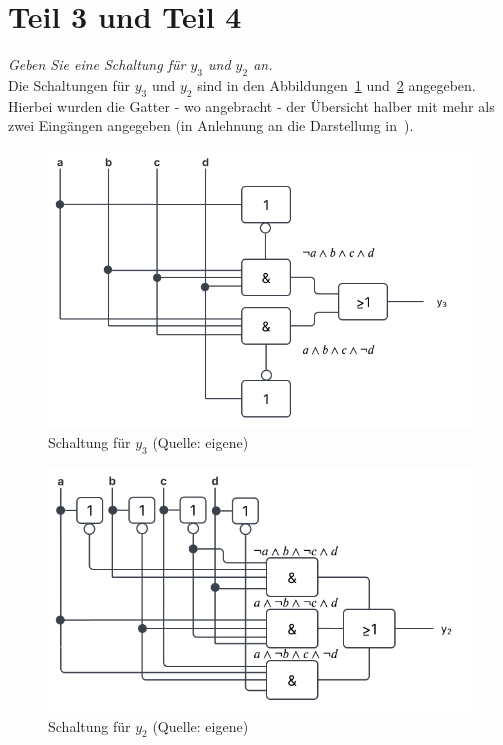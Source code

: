 \section{Teil 3 und Teil 4}

\textit{Geben Sie eine Schaltung für $y_3$ und $y_2$ an.}\\


\noindent
Die Schaltungen für $y_3$ und $y_2$ sind in den Abbildungen~\ref{fig:schaltplan_y3} und~\ref{fig:schaltplan_y2} angegeben.
Hierbei wurden die Gatter - wo angebracht - der Übersicht halber mit mehr als zwei Eingängen angegeben (in Anlehnung an die Darstellung in~\cite[\textbf{Abbildung 24}, 57]{BL22}).

\begin{figure}
    \centering
    \includegraphics[scale=0.5]{aufgabe 2/img/schaltplan_y3}
    \caption{Schaltung für $y_3$ (Quelle: eigene)}
    \label{fig:schaltplan_y3}
\end{figure}


\begin{figure}
    \centering
    \includegraphics[scale=0.52]{aufgabe 2/img/schaltplan_y2}
    \caption{Schaltung für $y_2$ (Quelle: eigene)}
    \label{fig:schaltplan_y2}
\end{figure}

